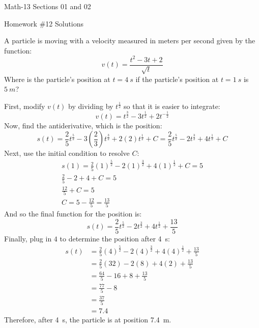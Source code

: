 \documentclass[letterpaper,12pt,fleqn]{article}
\begin{document}
\begin{center}
  \large
  Math-13 Sections 01 and 02

  \Large
  Homework \#12 Solutions
\end{center}

\vspace{0.5in}

A particle is moving with a velocity measured in meters per second given by the function:
\[v(t)=\frac{t^2-3t+2}{\sqrt{t}}\]
Where is the particle's position at \(t=\SI{4}{s}\) if the particle's position at \(t=\SI{1}{s}\) is \(\SI{5}{m}\)?

First, modify \(v(t)\) by dividing by \(t^{\frac{1}{2}}\) so that it is easier to integrate:
\[v(t)=t^{\frac{3}{2}}-3t^{\frac{1}{2}}+2t^{-\frac{1}{2}}\]
Now, find the antiderivative, which is the position:
\[s(t)=\frac{2}{5}t^{\frac{5}{2}}-3\left(\frac{2}{3}\right)t^{\frac{3}{2}}+2(2)t^{\frac{1}{2}}+C=
\frac{2}{5}t^{\frac{5}{2}}-2t^{\frac{3}{2}}+4t^{\frac{1}{2}}+C\]
Next, use the initial condition to resolve \(C\):
\begin{gather*}
  s(1)=\frac{2}{5}(1)^{\frac{5}{2}}-2(1)^{\frac{3}{2}}+4(1)^{\frac{1}{2}}+C=5 \\
  \frac{2}{5}-2+4+C=5 \\
  \frac{12}{5}+C=5 \\
  C=5-\frac{12}{5}=\frac{13}{5}
\end{gather*}
And so the final function for the position is:
\[s(t)=\frac{2}{5}t^{\frac{5}{2}}-2t^{\frac{3}{2}}+4t^{\frac{1}{2}}+\frac{13}{5}\]
Finally, plug in \(4\) to determine the position after \SI{4}{s}:
\begin{align*}
  s(t) &= \frac{2}{5}(4)^{\frac{5}{2}}-2(4)^{\frac{3}{2}}+4(4)^{\frac{1}{2}}+\frac{13}{5} \\
  &= \frac{2}{5}(32)-2(8)+4(2)+\frac{13}{5} \\
  &= \frac{64}{5}-16+8+\frac{13}{5} \\
  &= \frac{77}{5}-8 \\
  &= \frac{37}{5} \\
  &= 7.4
\end{align*}
Therefore, after \SI{4}{s}, the particle is at position \SI{7.4}{m}.
\end{document}
